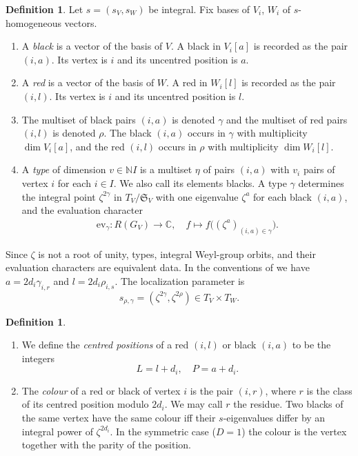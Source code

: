 \documentclass[11pt,reqno]{amsart}
\theoremstyle{definition}
\newtheorem{Definition}[Theorem]{Definition}
\theoremstyle{remark}
\def\ev{\mathrm{ev}}
\begin{document}
\begin{Definition}\label{def:blacks}
Let $s=(s_V,s_W)$ be integral.
Fix bases of $V_i$, $W_i$  of $s$-homogeneous vectors.
\begin{enumerate}[label=$\mathrm{(\alph*)}$,leftmargin=8mm]
\item 
A \emph{black} is a vector of the basis of $V$. A black in $V_i[a]$ is recorded as the pair $(i,a)$.
Its {vertex} is $i$ and its {uncentred position} is $a$. 
\item 
A \emph{red} is a vector of the basis of $W$. A red in $W_i[l]$ is recorded as the pair $(i,l)$. 
Its vertex is $i$ and its uncentred position is $l$.
\item 
The multiset of black pairs $(i,a)$ is denoted $\gamma$ and the multiset of red pairs $(i,l)$ is denoted  $\rho$. 
The black $(i,a)$ occurs in $\gamma$ with multiplicity $\dim V_i[a]$, and the red $(i,l)$ occurs in $\rho$ with multiplicity $\dim W_i[l]$.
\item
A \emph{type} of dimension $v\in\mathbb N I$ 
is a multiset $\eta$ of pairs $(i,a)$ with $v_i$ pairs of vertex $i$ for each $i\in I$.
We also call its elements blacks.
A type $\gamma$ determines the integral point $\zeta^{2\gamma}$ in $T_V/\mathfrak S_V$ 
with one eigenvalue $\zeta^a$ for each black $(i,a)$, and the evaluation character
\begin{align}\label{EVG}\ev_\gamma:R(G_V)\to\mathbb C,\quad f\mapsto f\big((\zeta^a)_{(i,a)\in\gamma}\big).\end{align}
\end{enumerate}
\end{Definition}


Since $\zeta$ is not a root of unity, types, integral Weyl-group
orbits, and their evaluation characters are equivalent data.
In the conventions of \cite{VVsh} we have
$a=2d_i\gamma_{i,r}$ and $l=2d_i\rho_{i,s}$.
The localization parameter is
$$s_{\rho,\gamma}=(\zeta^{2\gamma},\zeta^{2\rho})\in T_V\times T_W.$$


\begin{Definition}\hfill
\begin{enumerate}[label=$\mathrm{(\alph*)}$,leftmargin=8mm]
\item
We define the \emph{centred positions} of a  red $(i,l)$ or black $(i,a)$ to be the integers
\[
L=l+d_i,\quad P=a+d_i.
\]
\item
The \emph{colour} of a red or black of vertex $i$ is the pair $(i,r)$, where $r$ is the class of its centred position modulo $2d_i$. 
We may call $r$ the residue.
Two blacks of the same vertex have the same colour iff their $s$-eigenvalues differ by an integral power of $\zeta^{2d_i}$.
In the symmetric case ($D=1$) the colour is the vertex together with the parity of the position. 
\end{enumerate}
\end{Definition}
\end{document}
